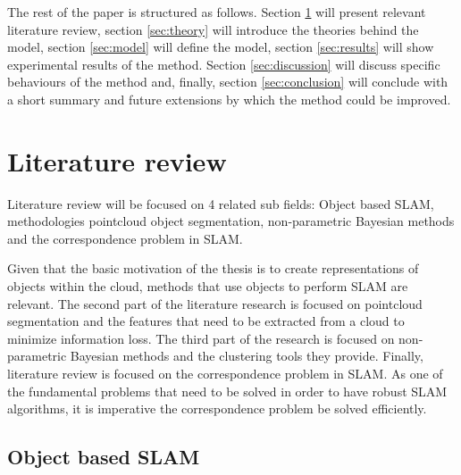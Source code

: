 \documentclass[twoside,hidelinks]{article}
\begin{document}
The rest of the paper is structured as follows. Section \ref{sec:literature} will present relevant literature review, section \ref{sec:theory} will introduce the theories behind the model, section \ref{sec:model} will define the model, section \ref{sec:results} will show experimental results of the method. Section \ref{sec:discussion} will discuss specific behaviours of the method and, finally, section \ref{sec:conclusion} will conclude with a short summary and future extensions by which the method could be improved.


\newpage
\section{Literature review}
\label{sec:literature}

Literature review will be focused on 4 related sub fields: Object based SLAM, methodologies pointcloud object segmentation, non-parametric Bayesian methods and the correspondence problem in SLAM.

Given that the basic motivation of the thesis is to create representations of objects within the cloud, methods that use objects to perform SLAM are relevant. The second part of the literature research is focused on pointcloud segmentation and the features that need to be extracted from a cloud to minimize information loss. The third part of the research is focused on non-parametric Bayesian methods and the clustering tools they provide. Finally, literature review is focused on the correspondence problem in SLAM. As one of the fundamental problems that need to be solved in order to have robust SLAM algorithms, it is imperative the correspondence problem be solved efficiently. 

\subsection{Object based SLAM}
\end{document}
